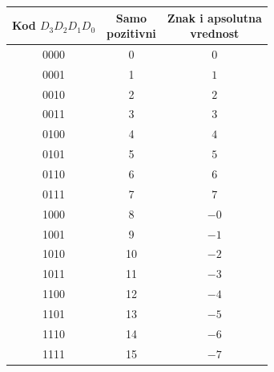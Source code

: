 \begin{tabular}{ccc}\toprule
\makecell{Kod\\$D_3 D_2 D_1 D_0$}&\makecell{Samo\\pozitivni}&\makecell{Znak i apsolutna\\vrednost}\\\midrule
0000&0&$0$\\
0001&1&$1$\\
0010&2&$2$\\
0011&3&$3$\\
0100&4&$4$\\
0101&5&$5$\\
0110&6&$6$\\
0111&7&$7$\\
\midrule
1000&8&$-0$\\
1001&9&$-1$\\
1010&10&$-2$\\
1011&11&$-3$\\
1100&12&$-4$\\
1101&13&$-5$\\
1110&14&$-6$\\
1111&15&$-7$\\
\bottomrule\end{tabular}

